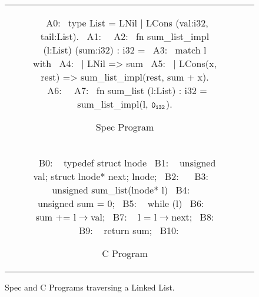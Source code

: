 \begin{figure}[H]
\begin{tabular}{cc}
\begin{subfigure}[b]{\textwidth}
\begin{center}
\begin{allLangEnvFoot}
~{\scriptsize \textcolor{mygray}{A0:}}~ type List = LNil | LCons (val:i32, tail:List).
~{\scriptsize \textcolor{mygray}{A1:}}~
~{\scriptsize \textcolor{mygray}{A2:}}~ fn sum_list_impl (l:List) (sum:i32) : i32 =
~{\scriptsize \textcolor{mygray}{A3:}}~    match l with
~{\scriptsize \textcolor{mygray}{A4:}}~    | LNil => sum
~{\scriptsize \textcolor{mygray}{A5:}}~    | LCons(x, rest) => sum_list_impl(rest, sum + x).
~{\scriptsize \textcolor{mygray}{A6:}}~
~{\scriptsize \textcolor{mygray}{A7:}}~ fn sum_list (l:List) : i32 = sum_list_impl(l, ${\tt 0_{i32}}$).
\end{allLangEnvFoot}
\end{center}
\caption{\label{fig:llTraverseSpec}Spec Program}
\end{subfigure}%
\\
\begin{subfigure}[b]{\textwidth}
\begin{center}
\begin{allLangEnvFoot}
~{\scriptsize \textcolor{mygray}{B0: }}~ typedef struct lnode {
~{\scriptsize \textcolor{mygray}{B1: }}~   unsigned val; struct lnode* next; } lnode;
~{\scriptsize \textcolor{mygray}{B2: }}~ 
~{\scriptsize \textcolor{mygray}{B3: }}~ unsigned sum_list(lnode* l) {
~{\scriptsize \textcolor{mygray}{B4: }}~   unsigned sum = 0;
~{\scriptsize \textcolor{mygray}{B5: }}~   while (l) {
~{\scriptsize \textcolor{mygray}{B6: }}~     sum += l$\rightarrow$val;
~{\scriptsize \textcolor{mygray}{B7: }}~     l = l$\rightarrow$next;
~{\scriptsize \textcolor{mygray}{B8: }}~   }
~{\scriptsize \textcolor{mygray}{B9: }}~   return sum;
~{\scriptsize \textcolor{mygray}{B10:}}~ }
\end{allLangEnvFoot}
\end{center}
\caption{\label{fig:llTraverseC}C Program}
\end{subfigure}%
\\
\end{tabular}
\caption{\label{fig:llTraverseSpecAndC}Spec and C Programs traversing a Linked List.}
\end{figure}
